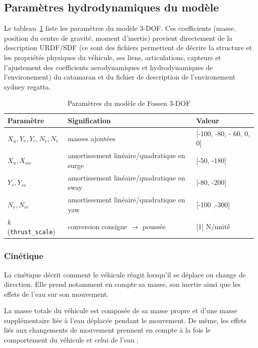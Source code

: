 \documentclass{rapportEILCO}
\begin{document}
	\subsection{Paramètres hydrodynamiques du modèle}
	\label{sec:parametres}
	
	Le tableau~\ref{tab:params} liste les paramètres du modèle 3-DOF. Ces coefficients (masse, position du centre de gravité, moment
	d'inertie) provient directement de la description URDF/SDF (ce sont des fichiers permettent de décrire la structure et les propriétés physiques du véhicule, ses liens, articulations, capteurs et l'ajustement des coefficients aerodynamiques et hydrodynamiques de l'environement) du catamaran et du fichier de description de l'environement sydney regatta.
	
	\begin{table}[H]
		\centering
		\caption{Paramètres du modèle de Fossen 3-DOF}
		\label{tab:params}
		\begin{tabular}{lll}
			\toprule
			\textbf{Paramètre} & \textbf{Signification} & \textbf{Valeur} \\
			\midrule
			$X_{\dot u}, Y_{\dot v}, Y_{\dot r}, N_{\dot v}, N_{\dot r}$ & masses ajoutées & [-100, -80, - 60, 0, 0] \\
			$X_u, X_{uu}$ & amortissement linéaire/quadratique en surge & [-50, -180] \\
			$Y_v, Y_{vv}$ & amortissement linéaire/quadratique en sway & [-80, -200] \\
			$N_r, N_{rr}$ & amortissement linéaire/quadratique en yaw & [-100 ,-300] \\
			$k$ (\texttt{thrust\_scale}) & conversion consigne $\rightarrow$ poussée & [1] N/unité \\
			\bottomrule
		\end{tabular}
	\end{table}
	
\subsubsection{Cinétique}

La cinétique décrit comment le véhicule réagit lorsqu'il se déplace ou change de direction. Elle prend notamment en compte sa masse, son inertie ainsi que les effets de l'eau sur son mouvement.

La masse totale du véhicule est composée de sa masse propre et d'une masse supplémentaire liée à l'eau déplacée pendant le mouvement. De même, les effets liés aux changements de mouvement prennent en compte à la fois le comportement du véhicule et celui de l'eau :
\end{document}

